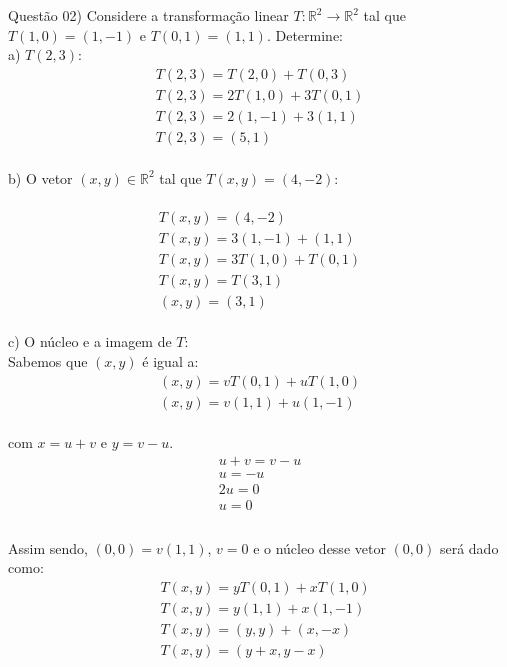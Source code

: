 
\noindent \textcolor{COLOR1}{Questão 02)} Considere a transformação linear $T: \mathbb{R}^2\to \mathbb{R}^2$ tal que $T(1,0)=(1,-1)$ e $T(0,1)=(1,1)$. Determine:\\

a) $T(2,3)$:\\

\[
    \begin{array}{l}
        T(2,3) = T(2,0) + T(0,3)   \\
        T(2,3) = 2T(1,0) + 3T(0,1) \\
        T(2,3) = 2(1,-1) + 3(1,1)  \\
        T(2,3) = (5,1)
    \end{array}
\]\\

b) O vetor $(x,y)\in \mathbb{R}^2 $ tal que $T(x,y)=\left(4,-2\right)$:\\
\\

\[
    \begin{array}{l}
        T(x,y) = (4,-2)           \\
        T(x,y) = 3(1,-1) + (1,1)  \\
        T(x,y) = 3T(1,0) + T(0,1) \\
        T(x,y) = T(3,1)           \\
        (x,y) = (3,1)
    \end{array}
\]
\\

c) O núcleo e a imagem de $T$:\\

Sabemos que $(x,y)$ é igual a:\\

\[
    \begin{array}{l}
        (x,y) = vT(0,1) + uT(1,0) \\
        (x,y) = v(1,1) + u(1,-1)
    \end{array}
\]
\\

com $x=u+v$ e $y=v-u$.\\

\[
    \begin{array}{l}
        u+v=v-u \\
        u=-u    \\
        2u=0    \\
        u=0     \\
    \end{array}
\]
\\

Assim sendo, $(0,0)=v(1,1)$, $v=0$ e o núcleo desse vetor $(0,0)$ será dado como:\\

\[
    \begin{split}
        &T(x,y) = yT(0,1) + xT(1,0) \\
        &T(x,y) = y(1,1) + x(1,-1) \\
        &T(x,y) = (y,y) + (x,-x) \\
        &T(x,y) = (y+x,y-x) \\
    \end{split}
\]\\

